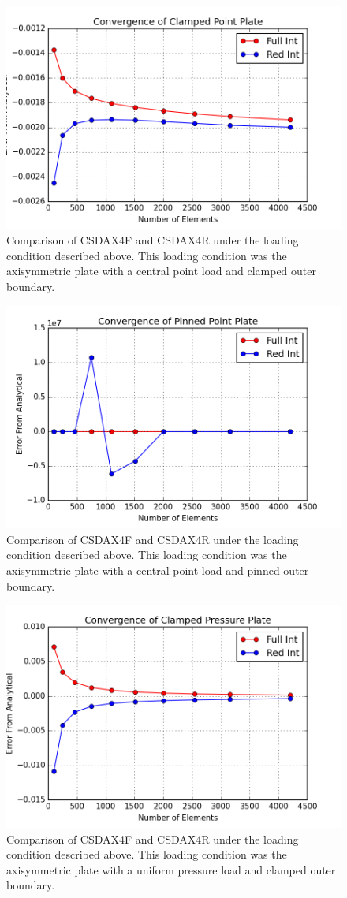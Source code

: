 \documentclass[10pt,letterpaper]{report}
\numberwithin{equation}{chapter}
\begin{document}
\begin{figure}[H]
\centering
\includegraphics[width=0.7\linewidth]{./GoodImages/Conv_PlPoCl_1}
\caption[H refinement of CSDAX4F]{Comparison of CSDAX4F and CSDAX4R under the loading condition described above. This loading condition was the axisymmetric plate with a central point load and clamped outer boundary.}
\label{fig:Conv_PlPoCl_1}
\end{figure}

\begin{figure}[H]
\centering
\includegraphics[width=0.7\linewidth]{./GoodImages/Conv_PlPoPi_1}
\caption[H refinement of CSDAX4F]{Comparison of CSDAX4F and CSDAX4R under the loading condition described above. This loading condition was the axisymmetric plate with a central point load and pinned outer boundary.}
\label{fig:Conv_PlPoCl_1}
\end{figure}

\begin{figure}[H]
\centering
\includegraphics[width=0.7\linewidth]{./GoodImages/Conv_PlPrCl_1}
\caption[H refinement of CSDAX4F]{Comparison of CSDAX4F and CSDAX4R under the loading condition described above. This loading condition was the axisymmetric plate with a uniform pressure load and clamped outer boundary.}
\label{fig:Conv_PlPoCl_1}
\end{figure}
\end{document}
